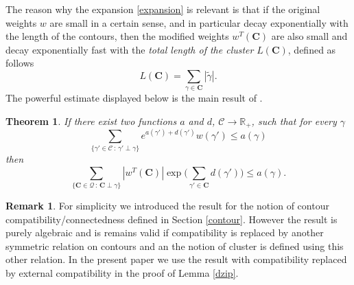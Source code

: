 \documentclass[JEP,XML,SOM,Unicode, NoFloatCountersInSection]{cedram}
\let\mathcal\mathscr
\newcommand{\sep}{\,:\,}
\numberwithin{equation}{section}
\theoremstyle{plain}
\newtheorem{theorema}{Theorem}
\theoremstyle{definition}
\newtheorem{rem}[theorem]{Remark}
\newcommand{\cQ}{{\ensuremath{\mathcal Q}} }
\newcommand{\cC}{{\ensuremath{\mathcal C}} }
\newcommand{\bC}{{\ensuremath{\mathbf C}} }
\newcommand{\bbR}{{\ensuremath{\mathbb R}} }
\begin{document}
The reason why the expansion \eqref{expansion} is relevant is that if the original weights $w$ are small in a certain sense, and in particular decay exponentially with the
length of the contours, then the modified weights $w^T(\bC)$ are also small and decay exponentially fast with the \textit{total length of the cluster} $L(\bC)$,
defined as follows
\begin{equation*}
L(\bC)=\sum_{\gamma\in \bC} |\tilde \gamma|.
\end{equation*}
The powerful estimate displayed below is the main result of \cite{cf:KP}.

\begin{theorema}\label{superclust}
If there exist two functions $a$ and $d$, $\cC\to \bbR_+$, such that for every $\gamma$%
\begin{equation}\label{condit}
\sum_{\{\gamma'\in \cC \sep \gamma' \perp \gamma\}} e^{a(\gamma')+d(\gamma')}w(\gamma')\le a(\gamma)
\end{equation}
then
\begin{equation}\label{dabound}
\sum_{\{ \bC\in \cQ \sep \bC \perp \gamma \}} |w^T(\bC)|\exp\biggl(\sum_{\gamma'\in\bC}d(\gamma')\biggr) \le a(\gamma).
\end{equation}
\end{theorema}

\begin{rem}\label{laremarc}
For simplicity we introduced the result for the notion of contour compatibility/connectedness defined in Section \ref{contour}.
However the result is purely algebraic and is remains valid if compatibility is replaced by another symmetric relation on contours and
an the notion of cluster is defined using this other relation.
In the present paper we use the result with compatibility replaced by external compatibility in the proof of Lemma \ref{dzip}.
\end{rem}
\end{document}
